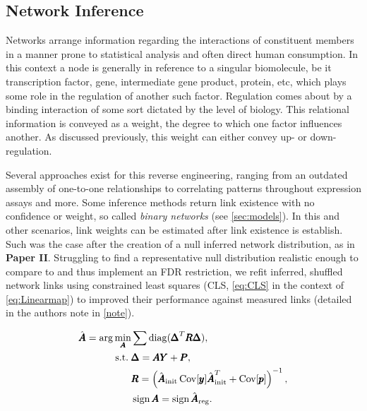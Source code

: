 
\subsection{Network Inference}
\label{sec:netinf}
Networks arrange information regarding the interactions of constituent members in a manner prone to statistical analysis and often direct human consumption. In this context a node is generally in reference to a singular biomolecule, be it transcription factor, gene, intermediate gene product, protein, etc, which plays some role in the regulation of another such factor. Regulation comes about by a binding interaction of some sort dictated by the level of biology. This relational information is conveyed as a weight, the degree to which one factor influences another. As discussed previously, this weight can either convey up- or down- regulation.

Several approaches exist for this reverse engineering, ranging from an outdated assembly of one-to-one relationships to correlating patterns throughout expression assays and more.
Some inference methods return link existence with no confidence or weight, so called \emph{binary networks} (see \cref{sec:models}). In this and other scenarios, link weights can be estimated after link existence is establish. Such was the case after the creation of a null inferred network distribution, as in \textbf{Paper II}. Struggling to find a representative null distribution realistic enough to compare to and thus implement an FDR restriction, we refit inferred, shuffled network links using constrained least squares (CLS, \cref{eq:CLS} in the context of \cref{eq:Linearmap}) to improved their performance against measured links (detailed in the authors note in \cref{note}). 


\begin{equation}%
\begin{aligned}\label{eq:CLS}
  \hat{\mA} = \arg \min_{\mA} & \sum \diag(\mDelta^T\mR \mDelta), \\
  \text{s.t.}\; & \mDelta = \mA \mY + \mP, \\
  & \mR = \left( \hat{\mA}_{\textrm{init}} \Cov[\by] \hat{\mA}_{\textrm{init}}^{T} + \Cov[\bp]\right)^{-1},\\ %
  & \sign{\mA} = \sign{\hat{\mA}_{\textrm{reg}}}. \\
\end{aligned}
\end{equation}

